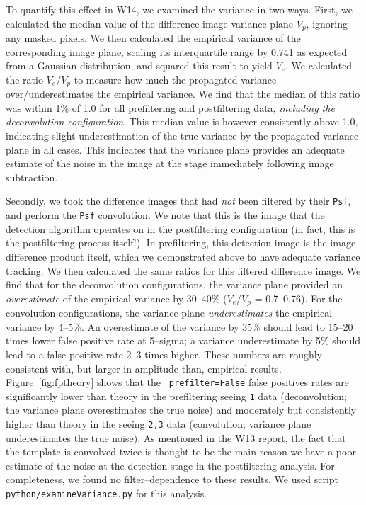 \documentclass[prd, nofootinbib, floatfix, 11pt, tightenlines, times]{article}
\begin{document}
To quantify this effect in W14, we examined the variance in two ways.
First, we calculated the median value of the difference image variance
plane $V_p$, ignoring any masked pixels.  We then calculated the
empirical variance of the corresponding image plane, scaling its
interquartile range by 0.741 as expected from a Gaussian distribution,
and squared this result to yield $V_e$.  We calculated the ratio
$V_e$/$V_p$ to measure how much the propagated variance
over/underestimates the empirical variance.  We find that the median
of this ratio was within 1\% of 1.0 for all prefiltering and
postfiltering data, {\it including the deconvolution configuration}.
This median value is however consistently above 1.0, indicating slight
underestimation of the true variance by the propagated variance plane
in all cases.  This indicates that the variance plane provides an
adequate estimate of the noise in the image at the stage immediately
following image subtraction.

Secondly, we took the difference images that had {\it not} been
filtered by their {\tt Psf}, and perform the {\tt Psf} convolution.
We note that this is the image that the detection algorithm operates
on in the postfiltering configuration (in fact, this is the
postfiltering process itself!).  In prefiltering, this detection image
is the image difference product itself, which we demonstrated above to
have adequate variance tracking.  We then calculated the same ratios
for this filtered difference image.  We find that for the
deconvolution configurations, the variance plane provided an {\it
  overestimate} of the empirical variance by 30--40\% ($V_e$/$V_p$ =
0.7--0.76).  For the convolution configurations, the variance plane
{\it underestimates} the empirical variance by 4--5\%.  An
overestimate of the variance by 35\% should lead to 15--20 times lower
false positive rate at 5--sigma; a variance underestimate by 5\%
should lead to a false positive rate 2--3 times higher.  These numbers
are roughly consistent with, but larger in amplitude than, empirical
results.  Figure~\ref{fig:fptheory} shows that the {\tt
  prefilter=False} false positives rates are significantly lower than
theory in the prefiltering seeing {\tt 1} data (deconvolution; the
variance plane overestimates the true noise) and moderately but
consistently higher than theory in the seeing {\tt 2,3} data
(convolution; variance plane underestimates the true noise).  As
mentioned in the W13 report, the fact that the template is convolved
twice is thought to be the main reason we have a poor estimate of the
noise at the detection stage in the postfiltering analysis.  For
completeness, we found no filter--dependence to these results.  We
used script {\tt python/examineVariance.py} for this analysis.
\end{document}
